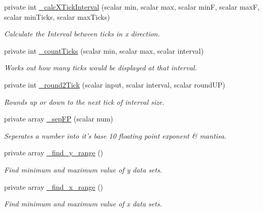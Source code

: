 \begin{DoxyCompactItemize}
private int \hyperlink{classChart_1_1Base_abc810d13339a6b0ab2f08ff8a96b82cb}{\_\-calcXTickInterval} (scalar min, scalar max, scalar minF, scalar maxF, scalar minTicks, scalar maxTicks)
\begin{DoxyCompactList}\small\item\em Calculate the Interval between ticks in x direction. \item\end{DoxyCompactList}\item 
private int \hyperlink{classChart_1_1Base_afb289639a7016adabc1cb03ae7851269}{\_\-countTicks} (scalar min, scalar max, scalar interval)
\begin{DoxyCompactList}\small\item\em Works out how many ticks would be displayed at that interval. \item\end{DoxyCompactList}\item 
private int \hyperlink{classChart_1_1Base_afaa4e9e29bc7fb9df56e9c7cd168e79b}{\_\-round2Tick} (scalar input, scalar interval, scalar roundUP)
\begin{DoxyCompactList}\small\item\em Rounds up or down to the next tick of interval size. \item\end{DoxyCompactList}\item 
private array \hyperlink{classChart_1_1Base_ab1f985ad443c2f1d1bf3ef86e9382346}{\_\-sepFP} (scalar num)
\begin{DoxyCompactList}\small\item\em Seperates a number into it's base 10 floating point exponent \& mantisa. \item\end{DoxyCompactList}\item 
private array \hyperlink{classChart_1_1Base_ad28e18fc86eebc6846785580977532ca}{\_\-find\_\-y\_\-range} ()
\begin{DoxyCompactList}\small\item\em Find minimum and maximum value of y data sets. \item\end{DoxyCompactList}\item 
private array \hyperlink{classChart_1_1Base_ab5b79dbb6f086902396bf5fd4c2248ef}{\_\-find\_\-x\_\-range} ()
\begin{DoxyCompactList}\small\item\em Find minimum and maximum value of x data sets. \item\end{DoxyCompactList}\item 

\end{DoxyCompactItemize}
